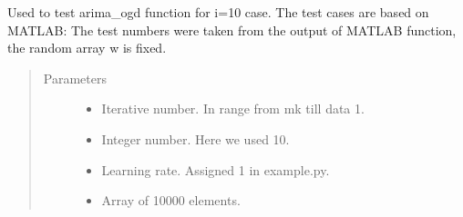 \documentclass[letterpaper,10pt,english]{sphinxmanual}
\begin{document}
\begin{fulllineitems}
\label{\detokenize{LDS:LDS.OnlineLDS_library.test_arima_ogd}}
\sphinxAtStartPar
Used to test arima\_ogd function for i=10 case.
The test cases are based on MATLAB:
The test numbers were taken from the output of MATLAB function,
the random array w is fixed.
\begin{quote}\begin{description}
\item[{Parameters}] \leavevmode\begin{itemize}
\item {} 
\sphinxAtStartPar
{} \textendash{} Iterative number. In range from mk till data \sphinxhyphen{} 1.

\item {} 
\sphinxAtStartPar
{} \textendash{} Integer number. Here we used 10.

\item {} 
\sphinxAtStartPar
{} \textendash{} Learning rate. Assigned 1 in example.py.

\item {} 
\sphinxAtStartPar
{} \textendash{} Array of 10000 elements.

\end{itemize}

\end{description}\end{quote}

\end{fulllineitems}

\end{document}
